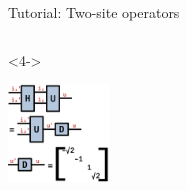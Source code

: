 \begin{frame}[fragile]{Tutorial: Two-site operators}
\begin{columns}
\begin{column}{5cm}
\begin{onlyenv}<4->
\vspace*{0.0cm}
\begin{center}
\includegraphics[width=0.2\textwidth]{
  slides/assets/eigen_H.png
}
\end{center}
\vspace*{0.0cm}
\end{onlyenv}

\end{column}

\end{columns}

\end{frame}
